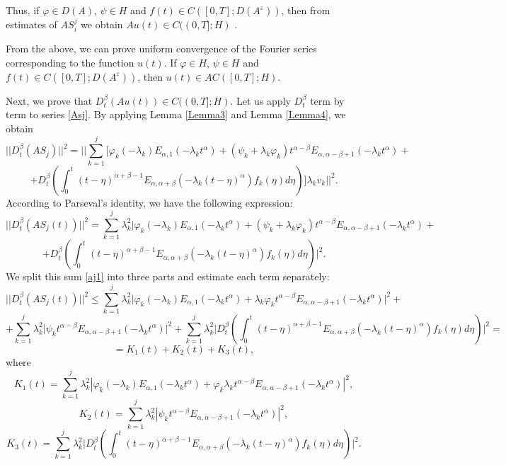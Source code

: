 \documentclass{amsart}
\numberwithin{equation}{section}
\begin{document}
Thus, if $\varphi \in D(A)$, $\psi \in H$ and $f(t)\in C([0,T];D(A^\varepsilon))$, then from estimates of $AS_i^j$ we obtain $Au(t)\in C((0,T];H)$ .

From the above, we can prove uniform convergence of the Fourier series corresponding to the function $u(t)$. If  $\varphi \in H$, $\psi \in H$ and $f(t)\in C\left([0,T];D(A^\varepsilon)\right)$, then $u(t) \in AC([0,T];H)$.

Next, we prove  that  $D_t^\beta (Au(t))\in C((0,T];H)$. Let us apply $D_t^\beta$ term by term to series \eqref{Asj}. By applying Lemma \ref{Lemma3} and Lemma \ref{Lemma4}, we obtain
$$
||D_t^\beta(AS_j)||^2=\bigg|\bigg|\sum_{k=1}^j\bigg[\varphi_k(-\lambda_k)E_{\alpha,1}(-\lambda_k t^\alpha)+(\psi_k+\lambda_k\varphi_k)t^{\alpha-\beta}E_{\alpha,\alpha-\beta+1}(-\lambda_k t^\alpha)+
$$
$$
+D_t^{\beta}\left(\int_0^t (t-\eta)^{\alpha+\beta-1}E_{\alpha,\alpha+\beta}(-\lambda_k(t-\eta)^\alpha)f_k(\eta) d\eta\right)\bigg]\lambda_k v_k\bigg|\bigg|^2.
$$
 According to Parseval's identity, we have the following expression:
$$
||D_t^\beta(AS_j(t))||^2=\sum_{k=1}^j\lambda_k^2 \bigg|\varphi_k(-\lambda_k)E_{\alpha,1}(-\lambda_k t^\alpha)+(\psi_k+\lambda_k\varphi_k)t^{\alpha-\beta}E_{\alpha,\alpha-\beta+1}(-\lambda_k t^\alpha)+
$$
\begin{equation} \label{aj1}
 +D_t^{\beta}\left(\int_0^t (t-\eta)^{\alpha+\beta-1}E_{\alpha,\alpha+\beta}(-\lambda_k(t-\eta)^\alpha)f_k(\eta) d\eta\right)\bigg|^2.
\end{equation}
We split this sum \eqref{aj1} into three parts and estimate each term separately:
$$
||D_t^\beta(AS_j(t))||^2\leq \sum_{k=1}^j\lambda_k^2 \bigg|\varphi_k(-\lambda_k)E_{\alpha,1}(-\lambda_k t^\alpha)+\lambda_k\varphi_k t^{\alpha-\beta}E_{\alpha,\alpha-\beta+1}(-\lambda_k t^\alpha)\bigg|^2+
$$
$$
 +\sum_{k=1}^j \lambda_k^2 \bigg|\psi_k t^{\alpha-\beta}E_{\alpha,\alpha-\beta+1}(-\lambda_k t^\alpha)\bigg|^2+\sum_{k=1}^j \lambda_k^2\bigg| D_t^{\beta}\left(\int_0^t (t-\eta)^{\alpha+\beta-1}E_{\alpha,\alpha+\beta}(-\lambda_k(t-\eta)^\alpha)f_k(\eta) d\eta\right)\bigg|^2=
$$
\begin{equation}\label{yig2}
    =K_1(t)+K_2(t)+K_3(t),
\end{equation}
where
$$K_1(t)=\sum_{k=1}^j \lambda_k^2 \left|\varphi_k(-\lambda_k)E_{\alpha,1}(-\lambda_k t^\alpha)+\varphi_k \lambda_k t^{\alpha-\beta}E_{\alpha,\alpha-\beta+1}(-\lambda_k t^\alpha)\right|^2,$$
$$K_2(t)=\sum_{k=1}^j \lambda_k^2\left|\psi_k t^{\alpha-\beta} E_{\alpha,\alpha-\beta+1}(-\lambda_k t^\alpha)\right|^2,$$
$$K_3(t)=\sum_{k=1}^j \lambda_k^2\bigg| D_t^{\beta}\left(\int_0^t (t-\eta)^{\alpha+\beta-1}E_{\alpha,\alpha+\beta}(-\lambda_k(t-\eta)^\alpha)f_k(\eta) d\eta\right)\bigg|^2.$$
\end{document}
